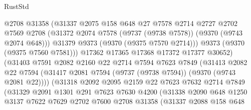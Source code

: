 \begin{lexlean}{RustStd}
\begin{coremodule}
                            @2708
                            @31358
                            (@31337
                              @2075
                              @158
                              @648
                              @27
                              @7578
                              @2714
                              @2727
                              @2702
                              @7569
                              @2708
                              (@31372 @2074 @7578 (@9737 (@9738 @7578)) (@9370 (@9743 @2074 @648)))
                              @31379
                              @9373
                              (@9370 (@9375 @7570 @2714)))
                            @9373
                            (@9370 (@9375 @7560 @7581)))
                          @17362
                          @17365
                          @17368
                          @17372
                          @17377
                          @30652)
                        (@31403
                          @7591
                          @2082
                          @2160
                          @22
                          @2714
                          @7594
                          @7623
                          @7849
                          (@31413
                            @2082
                            @22
                            @7594
                            (@31417 @2081 @7594 (@9737 (@9738 @7594)) (@9370 (@9743 @2081 @22))))
                          (@31318
                            @2092
                            @2095
                            @2159
                            @22
                            @7623
                            @7632
                            @2714
                            @7849
                            (@31329
                              @2091
                              @1301
                              @291
                              @7623
                              @7630
                              @4200
                              (@31338
                                @2090
                                @648
                                @1250
                                @3137
                                @7622
                                @7629
                                @2702
                                @7600
                                @2708
                                @31358
                                (@31337
                                  @2088
                                  @158
                                  @648

\end{coremodule}
\end{lexlean}
